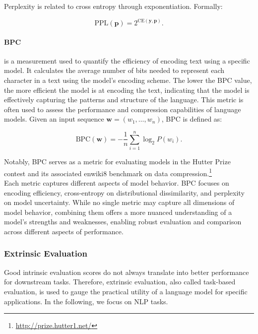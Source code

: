 \noindent Perplexity is related to cross entropy through exponentiation. Formally:

\begin{equation}
    \text{PPL}(\bm{p}) = 2^{\text{CE}(\bm{y}, \bm{p})}.
\end{equation}


\paragraph{\ac{BPC}} is a measurement used to quantify the efficiency of encoding text using a specific model. It calculates the average number of bits needed to represent each character in a text using the model's encoding scheme. The lower the \ac{BPC} value, the more efficient the model is at encoding the text, indicating that the model is effectively capturing the patterns and structure of the language. This metric is often used to assess the performance and compression capabilities of language models. Given an input sequence $\bm{w} = (w_1, \ldots, w_n)$, \ac{BPC} is defined as:

\begin{equation}
    \text{BPC}(\bm{w}) = - \dfrac{1}{n} \sum_{i=1}^n \log_2 P(w_i).
\end{equation}

\noindent Notably, \ac{BPC} serves as a metric for evaluating models in the Hutter Prize contest and its associated enwiki8 benchmark on data compression.\footnote{\url{http://prize.hutter1.net/}} \\

Each metric captures different aspects of model behavior. \ac{BPC} focuses on encoding efficiency, cross-entropy on distributional dissimilarity, and perplexity on model uncertainty. While no single metric may capture all dimensions of model behavior, combining them offers a more nuanced understanding of a model's strengths and weaknesses, enabling robust evaluation and comparison across different aspects of performance.

\subsubsection{Extrinsic Evaluation} Good intrinsic evaluation scores do not always translate into better performance for downstream tasks. Therefore, extrinsic evaluation, also called task-based evaluation, is used to gauge the practical utility of a language model for specific applications. In the following, we focus on \ac{NLP} tasks.

